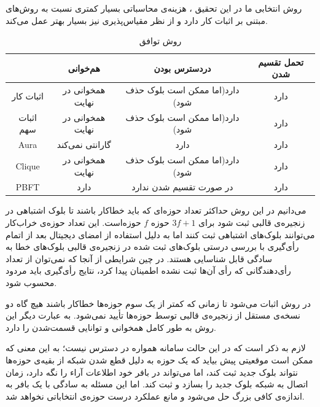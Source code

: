 روش انتخابی ما در این تحقیق
، هزینه‌ی محاسباتی بسیار کمتری نسبت به روش‌های مبتنی بر اثبات کار دارد و از نظر مقیاس‌پذیری
\cite{PBFperf}
نیز بسیار بهتر عمل می‌کند.

\begin{table}[th!]
	\begin{center}
		\caption{روش توافق}
		\begin{tabular}{|c|c|c|c|}
			\hline
			& هم‌خوانی & دردسترس بودن & تحمل تقسیم شدن \\
			\hline
			اثبات کار & همخوانی‌ در نهایت & دارد(اما ممکن است بلوک حذف شود) & دارد \\
			\hline
			اثبات سهم & همخوانی‌ در نهایت & دارد(اما ممکن است بلوک حذف شود) & دارد \\
			\hline
			Aura & گارانتی نمی‌کند & دارد & دارد \\
			\hline
			Clique & همخوانی‌ در نهایت & دارد(اما ممکن است بلوک حذف شود) & دارد \\
			\hline
			PBFT & دارد & در صورت تقسیم شدن ندارد & دارد \\
			\hline
		\end{tabular}
		\label{tab:cons}
	\end{center}
\end{table}

\par
می‌دانیم در این روش حداکثر تعداد حوزه‌ای که باید خطاکار باشند تا بلوک اشتباهی در زنجیره‌ی قالبی ثبت شود برای 
$3f + 1$
حوزه $f$ حوزه‌است.
این تعداد حوزه‌ی خراب‌کار می‌توانند بلوک‌های اشتباهی ثبت کنند اما به دلیل استفاده از امضای دیجیتال بعد از اتمام رأی‌گیری با بررسی درستی بلوک‌های ثبت شده در زنجیره‌ی قالبی بلوک‌های خطا به سادگی قابل شناسایی هستند. در چین شرایطی از آنجا که نمی‌توان از تعداد رأی‌دهندگانی که رأی‌ آن‌ها ثبت نشده اطمینان پیدا کرد، نتایج رأی‌گیری باید مردود محسوب شود. 
\par
در روش  اثبات می‌شود 
\cite{bftcap}
تا زمانی که کمتر از یک سوم حوزه‌ها خطاکار باشند هیچ گاه دو نسخه‌ی مستقل از زنجیره‌ی قالبی توسط حوزه‌ها تأیید نمی‌شود. به عبارت دیگر این روش به طور کامل همخوانی و توانایی قسمت‌شدن را دارد.
\par
لازم به ذکر است که در این حالت سامانه همواره در دسترس نیست؛ به این معنی که ممکن است موقعیتی پیش بیاید که یک حوزه به دلیل قطع شدن شبکه از بقیه‌ی حوزه‌ها نتواند بلوک جدید ثبت کند، اما می‌تواند در بافر خود اطلاعات آراء را نگه دارد، زمان اتصال به شبکه بلوک جدید را بسازد و ثبت کند. اما این مسئله به سادگی با یک بافر به اندازه‌ی کافی بزرگ حل می‌شود و مانع عملکرد درست حوزه‌ی انتخاباتی ‌نخواهد شد.

